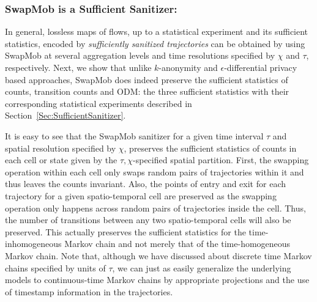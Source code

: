 \documentclass[times,twocolumn,final,authoryear]{elsarticle}
\begin{document}
\subsubsection{SwapMob is a Sufficient Sanitizer:}

In general, lossless maps of flows, up to a statistical experiment and its sufficient statistics, encoded by {\em sufficiently sanitized trajectories} can be obtained by using SwapMob at several aggregation levels and time resolutions specified by $\chi$ and $\tau$, respectively.  
Next, we show that unlike $k$-anonymity and $\epsilon$-differential privacy based approaches, SwapMob does indeed preserve the sufficient statistics of counts, transition counts and ODM: the three sufficient statistics with their corresponding statistical experiments described in Section~\ref{Sec:SufficientSanitizer}.

It is easy to see that the SwapMob sanitizer for a given time interval $\tau$ and spatial resolution specified by $\chi$, preserves the sufficient statistics of counts in each cell or state given by the $\tau,\chi$-specified spatial partition.  
First, the swapping operation within each cell only swaps random pairs of trajectories within it and thus leaves the counts invariant.  
Also, the points of entry and exit for each trajectory for a given spatio-temporal cell are preserved as the swapping operation only happens across random pairs of trajectories inside the cell.  
Thus, the number of transitions between any two spatio-temporal cells will also be preserved.  
This actually preserves the sufficient statistics for the time-inhomogeneous Markov chain and not merely that of the time-homogeneous Markov chain. 
Note that, although we have discussed about discrete time Markov chains specified by units of $\tau$, we can just as easily generalize the underlying models to continuous-time Markov chains by appropriate projections and the use of timestamp information in the trajectories.   
\end{document}
